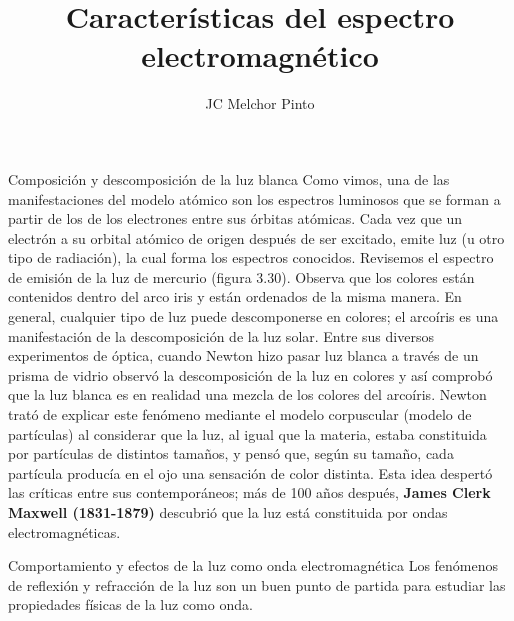 \documentclass[12pt,addpoints,answers]{guia}
\title{Características del espectro electromagnético}
\author{JC Melchor Pinto}
\begin{document}
\INFO%

\begin{multicols}{2}%
    
    
\end{multicols}%
\ejemplosboxed[]%
\begin{questions}
    \questionboxed[30]{}
    \questionboxed[30]{}
    \questionboxed[30]{}
    \questionboxed[25]{}
    \questionboxed[25]{}
    \begin{sectionbox}{Composición y descomposición de la luz blanca}
        Como vimos, una de las manifestaciones del modelo atómico son los espectros luminosos que se forman a partir de los  de los electrones entre sus órbitas atómicas.
        Cada vez que un electrón  a
        su orbital atómico de origen después
        de ser excitado, emite luz (u otro tipo
        de radiación), la cual forma los espectros conocidos. Revisemos el espectro
        de emisión de la luz de mercurio (figura 3.30).
        Observa que los colores están contenidos dentro del arco iris y están ordenados de
        la misma manera. En general, cualquier tipo de luz puede descomponerse en colores;
        el arcoíris es una manifestación de la descomposición de la luz solar. Entre sus diversos experimentos de óptica, cuando Newton hizo pasar luz blanca a través de un prisma de vidrio observó la descomposición de la luz en colores y así comprobó que la
        luz blanca es en realidad una mezcla de los colores del arcoíris. Newton trató de explicar este fenómeno mediante el modelo corpuscular (modelo de partículas) al considerar que la luz, al igual que la materia, estaba constituida por partículas de distintos
        tamaños, y pensó que, según su tamaño, cada partícula producía en el ojo una sensación de color distinta. Esta idea despertó las críticas entre sus contemporáneos; más
        de 100 años después, \textbf{James Clerk Maxwell (1831-1879)} descubrió que la luz está
        constituida por ondas electromagnéticas.
    \end{sectionbox}

    \begin{sectionbox}{Comportamiento y efectos de la luz como onda electromagnética}
        Los fenómenos de reflexión y refracción de la luz son un buen punto de partida para
        estudiar las propiedades físicas de la luz como onda.


\end{sectionbox}
\end{questions}
\end{document}

